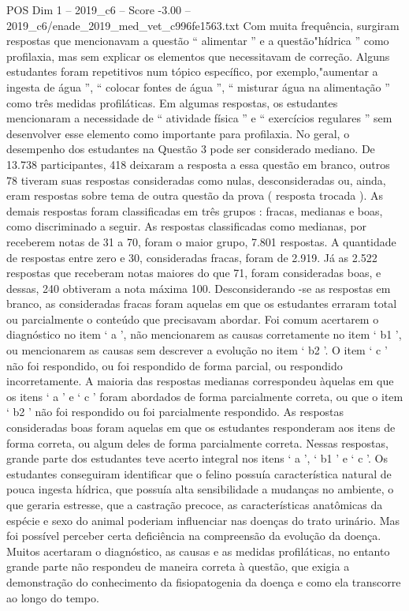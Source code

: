 \begin{textsample}{POS Dim 1 – 2019\_c6 – Score -3.00 – 2019\_c6/enade\_2019\_med\_vet\_c996fe1563.txt}
Com muita frequência, surgiram respostas que mencionavam a questão “ alimentar ” e a questão"hídrica ” como profilaxia, mas sem explicar os elementos que necessitavam de correção.
Alguns estudantes foram repetitivos num tópico específico, por exemplo,"aumentar a ingesta de água ”, “ colocar fontes de água ”, “ misturar água na alimentação ” como três medidas profiláticas.
Em algumas respostas, os estudantes mencionaram a necessidade de “ atividade física ” e “ exercícios regulares ” sem desenvolver esse elemento como importante para profilaxia.
No geral, o desempenho dos estudantes na Questão 3 pode ser considerado mediano.
De 13.738 participantes, 418 deixaram a resposta a essa questão em branco, outros 78 tiveram suas respostas consideradas como nulas, desconsideradas ou, ainda, eram respostas sobre tema de outra questão da prova ( resposta trocada ).
As demais respostas foram classificadas em três grupos : fracas, medianas e boas, como discriminado a seguir.
As respostas classificadas como medianas, por receberem notas de 31 a 70, foram o maior grupo, 7.801 respostas.
A quantidade de respostas entre zero e 30, consideradas fracas, foram de 2.919.
Já as 2.522 respostas que receberam notas maiores do que 71, foram consideradas boas, e dessas, 240 obtiveram a nota máxima 100.
Desconsiderando -se as respostas em branco, as consideradas fracas foram aquelas em que os estudantes erraram total ou parcialmente o conteúdo que precisavam abordar.
Foi comum acertarem o diagnóstico no item ‘ a ’, não mencionarem as causas corretamente no item ‘ b1 ’, ou mencionarem as causas sem descrever a evolução no item ‘ b2 ’.
O item ‘ c ’ não foi respondido, ou foi respondido de forma parcial, ou respondido incorretamente.
A maioria das respostas medianas correspondeu àquelas em que os itens ‘ a ’ e ‘ c ’ foram abordados de forma parcialmente correta, ou que o item ‘ b2 ’ não foi respondido ou foi parcialmente respondido.
As respostas consideradas boas foram aquelas em que os estudantes responderam aos itens de forma correta, ou algum deles de forma parcialmente correta.
Nessas respostas, grande parte dos estudantes teve acerto integral nos itens ‘ a ’, ‘ b1 ’ e ‘ c ’.
Os estudantes conseguiram identificar que o felino possuía característica natural de pouca ingesta hídrica, que possuía alta sensibilidade a mudanças no ambiente, o que geraria estresse, que a castração precoce, as características anatômicas da espécie e sexo do animal poderiam influenciar nas doenças do trato urinário.
Mas foi possível perceber certa deficiência na compreensão da evolução da doença.
Muitos acertaram o diagnóstico, as causas e as medidas profiláticas, no entanto grande parte não respondeu de maneira correta à questão, que exigia a demonstração do conhecimento da fisiopatogenia da doença e como ela transcorre ao longo do tempo.

\end{textsample}
